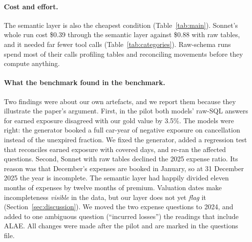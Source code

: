 \paragraph{Cost and effort.}
The semantic layer is also the cheapest condition (Table~\ref{tab:main}). Sonnet's whole run cost
\$0.39 through the semantic layer against \$0.88 with raw tables, and it needed far fewer tool calls
(Table~\ref{tab:categories}). Raw-schema runs spend most of their calls profiling tables and reconciling
movements before they compute anything.

\paragraph{What the benchmark found in the benchmark.}
Two findings were about our own artefacts, and we report them because they illustrate the paper's argument.
First, in the pilot both models' raw-SQL answers for earned exposure disagreed with our gold value by 3.5\%. The
models were right: the generator booked a full car-year of negative exposure on cancellation instead of the
unexpired fraction. We fixed the generator, added a regression test that reconciles earned exposure with
covered days, and re-ran the affected questions. Second, Sonnet with raw tables declined the 2025 expense ratio.
Its reason was that December's expenses are booked in January, so at 31 December 2025 the year is incomplete.
The semantic layer had happily divided eleven months of expenses by twelve months of premium. Valuation dates
make incompleteness \emph{visible} in the data, but our layer does not yet \emph{flag} it (Section~\ref{sec:discussion}).
We moved the two expense questions to 2024, and added to one ambiguous question (``incurred losses'') the
readings that include ALAE. All changes were made after the pilot and are marked in the questions file.
